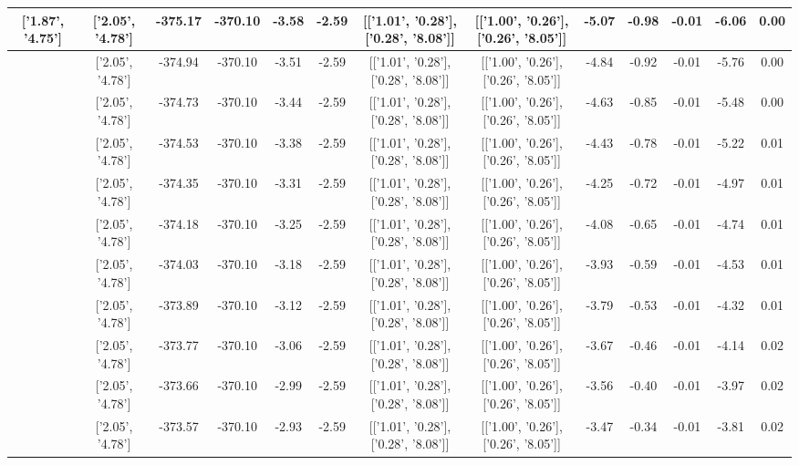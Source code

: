 \begin{table}[htbp]
\begin{adjustbox}{angle=90}
\begin{tabular}{|c|c|c|c|c|c|c|c|c|c|c|c|c|}
 ['1.87', '4.75'] & ['2.05', '4.78'] & -375.17 & -370.10 & -3.58 & -2.59 & [['1.01', '0.28'], ['0.28', '8.08']] & [['1.00', '0.26'], ['0.26', '8.05']] & -5.07 & -0.98 & -0.01 & -6.06 & 0.00\\ \hline
 ['1.88', '4.75'] & ['2.05', '4.78'] & -374.94 & -370.10 & -3.51 & -2.59 & [['1.01', '0.28'], ['0.28', '8.08']] & [['1.00', '0.26'], ['0.26', '8.05']] & -4.84 & -0.92 & -0.01 & -5.76 & 0.00\\ \hline
 ['1.89', '4.75'] & ['2.05', '4.78'] & -374.73 & -370.10 & -3.44 & -2.59 & [['1.01', '0.28'], ['0.28', '8.08']] & [['1.00', '0.26'], ['0.26', '8.05']] & -4.63 & -0.85 & -0.01 & -5.48 & 0.00\\ \hline
 ['1.91', '4.75'] & ['2.05', '4.78'] & -374.53 & -370.10 & -3.38 & -2.59 & [['1.01', '0.28'], ['0.28', '8.08']] & [['1.00', '0.26'], ['0.26', '8.05']] & -4.43 & -0.78 & -0.01 & -5.22 & 0.01\\ \hline
 ['1.92', '4.75'] & ['2.05', '4.78'] & -374.35 & -370.10 & -3.31 & -2.59 & [['1.01', '0.28'], ['0.28', '8.08']] & [['1.00', '0.26'], ['0.26', '8.05']] & -4.25 & -0.72 & -0.01 & -4.97 & 0.01\\ \hline
 ['1.93', '4.76'] & ['2.05', '4.78'] & -374.18 & -370.10 & -3.25 & -2.59 & [['1.01', '0.28'], ['0.28', '8.08']] & [['1.00', '0.26'], ['0.26', '8.05']] & -4.08 & -0.65 & -0.01 & -4.74 & 0.01\\ \hline
 ['1.94', '4.76'] & ['2.05', '4.78'] & -374.03 & -370.10 & -3.18 & -2.59 & [['1.01', '0.28'], ['0.28', '8.08']] & [['1.00', '0.26'], ['0.26', '8.05']] & -3.93 & -0.59 & -0.01 & -4.53 & 0.01\\ \hline
 ['1.95', '4.76'] & ['2.05', '4.78'] & -373.89 & -370.10 & -3.12 & -2.59 & [['1.01', '0.28'], ['0.28', '8.08']] & [['1.00', '0.26'], ['0.26', '8.05']] & -3.79 & -0.53 & -0.01 & -4.32 & 0.01\\ \hline
 ['1.96', '4.76'] & ['2.05', '4.78'] & -373.77 & -370.10 & -3.06 & -2.59 & [['1.01', '0.28'], ['0.28', '8.08']] & [['1.00', '0.26'], ['0.26', '8.05']] & -3.67 & -0.46 & -0.01 & -4.14 & 0.02\\ \hline
 ['1.97', '4.77'] & ['2.05', '4.78'] & -373.66 & -370.10 & -2.99 & -2.59 & [['1.01', '0.28'], ['0.28', '8.08']] & [['1.00', '0.26'], ['0.26', '8.05']] & -3.56 & -0.40 & -0.01 & -3.97 & 0.02\\ \hline
 ['1.99', '4.77'] & ['2.05', '4.78'] & -373.57 & -370.10 & -2.93 & -2.59 & [['1.01', '0.28'], ['0.28', '8.08']] & [['1.00', '0.26'], ['0.26', '8.05']] & -3.47 & -0.34 & -0.01 & -3.81 & 0.02\\ \hline

\end{tabular}
\end{adjustbox}
\end{table}
